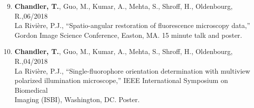 \documentclass[12pt,letterpaper]{article}
\newenvironment{benumerate}[1]{
    \let\oldItem\item
    \def\item{\addtocounter{enumi}{-2}\oldItem}
    \begin{enumerate}[labelsep=0.0125\textwidth, align=left]
    \setcounter{enumi}{#1}
    \addtocounter{enumi}{1}
}{
    \end{enumerate}
  }
\begin{document}
\begin{benumerate}{8}
\item {\textbf{Chandler, T.}, Guo, M., Kumar, A., Mehta, S., Shroff, H., Oldenbourg, R.,\hfill 06/2018\\ La Rivi\`ere, P.J., ``Spatio-angular restoration of fluorescence microscopy data,''\\
      Gordon Image Science Conference, Easton, MA. 15 minute talk and poster.}

\item {\textbf{Chandler, T.}, Guo, M., Kumar, A., Mehta, S., Shroff, H., Oldenbourg, R.,\hfill 04/2018\\ La Rivi\`ere, P.J., ``Single-fluorophore orientation determination with multiview\\ polarized
      illumination microscope,'' IEEE International Symposium on Biomedical\\ Imaging (ISBI), Washington, DC. Poster.}
\end{benumerate}
\end{document}
